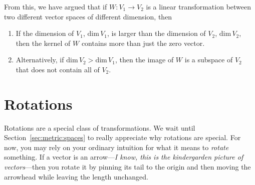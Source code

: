\documentclass[12pt]{article}
\begin{document}
From this, we have argued that if $W: V_1 \to V_2$ is a linear transformation between two different vector spaces of different dimension, then 
\begin{enumerate}
    \item If the dimension of $V_1$, $\text{dim}\,V_1$, is larger than the dimension of $V_2$, $\text{dim}\,V_2$, then the kernel of $W$ contains more than just the zero vector.
    \item Alternatively, if $\text{dim}\,V_2 > \text{dim}\,V_1$, then the image of $W$ is a subspace of $V_2$ that does not contain all of $V_2$. 
\end{enumerate}


\section{Rotations}
\label{sec:rotations}

Rotations are a special class of transformations. We wait until Section~\ref{sec:metric:spaces} to really appreciate why rotations are special. For now, you may rely on your ordinary intuition for what it means to \emph{rotate} something. If a vector is an arrow---\emph{I know, this is the kindergarden picture of vectors}---then you rotate it by pinning its tail to the origin and then moving the arrowhead while leaving the length unchanged. 
\end{document}
